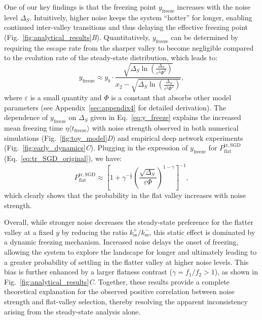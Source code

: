 \documentclass[aps,prx,reprint,superscriptaddress,longbibliography,nofootinbib,floatfix]{revtex4-2}
\begin{document}
One of our key findings is that the freezing point $y_\mathrm{freeze}$ increases with the noise level $\Delta_S$. Intuitively, higher noise keeps the system ``hotter'' for longer, enabling continued inter-valley transitions and thus delaying the effective freezing point (Fig.~\ref{fig:analytical_results}\textit{B}). Quantitatively, $y_\mathrm{freeze}$ can be determined by requiring the escape rate from the sharper valley to become negligible compared to the evolution rate of the steady-state distribution, which leads to: 
\begin{equation}
y_\mathrm{freeze} \approx y_b \cdot \frac{\sqrt{\Delta_S \ln\left( \frac{\Delta_S}{\varepsilon^2 \Phi^2} \right)}}{x_2 - \sqrt{\Delta_S \ln\left( \frac{\Delta_S}{\varepsilon^2 \Phi^2} \right)}},
\label{eq:y_freeze}
\end{equation}
where $\varepsilon$ is a small quantity and $\Phi$ is a constant that absorbs other model parameters (see Appendix~\ref{sec:appendix4} for detailed derivation). The dependence of $y_\mathrm{freeze}$ on $\Delta_S$ given in Eq.~\ref{eq:y_freeze} explains the increased mean freezing time $\eta \langle t_{\mathrm{freeze}} \rangle$ with noise strength observed in both numerical simulations (Fig.~\ref{fig:toy_model}\textit{D}) and empirical deep network experiments (Fig.~\ref{fig:early_dynamics}\textit{C}). Plugging in the expression of $y_\mathrm{freeze}$ for $P_{\mathrm{flat}}^{\mathrm{tr,SGD}}$ (Eq.~\ref{eq:tr_SGD_original}), we have:
\begin{equation}
P_{\mathrm{flat}}^{\mathrm{tr,SGD}} \approx \left[ 1 + \gamma^{-\frac{1}{2}} \left( \frac{\sqrt{\Delta_S}}{\varepsilon \Phi} \right)^{1-\gamma} \right]^{-1},
\label{eq:tr_SGD}
\end{equation}
which clearly shows that the probability in the flat valley increases with noise strength.

Overall, while stronger noise decreases the steady-state preference for the flatter valley at a fixed $y$ by reducing the ratio $k_\mathrm{ss}^{+}/k_\mathrm{ss}^{-}$, this static effect is dominated by a dynamic freezing mechanism. Increased noise delays the onset of freezing, allowing the system to explore the landscape for longer and ultimately leading to a greater probability of settling in the flatter valley at higher noise levels. This bias is further enhanced by a larger flatness contrast ($\gamma=f_1/f_2>1$), as shown in Fig.~\ref{fig:analytical_results}\textit{C}. Together, these results provide a complete theoretical explanation for the observed positive correlation between noise strength and flat-valley selection, thereby resolving the apparent inconsistency arising from the steady-state analysis alone.
\end{document}
